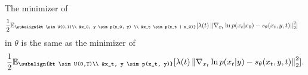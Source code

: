\begin{customthm}{1}
    The minimizer of
    \begin{gather*}
    \begin{aligned}
            &\frac{1}{2} \mathbb{E}_{\subalign{&t \sim U(0,T)\\ &x_0, y \sim p(x_0, y) \\ &x_t \sim p(x_t | x_0)}} 
            [\lambda(t) \norm{\nabla_{x_t} \ln{p(x_t | x_0)} - s_\theta(x_t, y, t)}_2^2]
    \end{aligned}
    \end{gather*}    
    in $\theta$ is the same as the minimizer of 
    \begin{gather*}
         \frac{1}{2} \mathbb{E}_{\subalign{&t \sim U(0,T)\\ &x_t, y \sim p(x_t, y)}} 
        [\lambda(t) \norm{\nabla_{x_t} \ln{p(x_t | y)} - s_\theta(x_t, y,t)}_2^2].
    \end{gather*}
\end{customthm}
